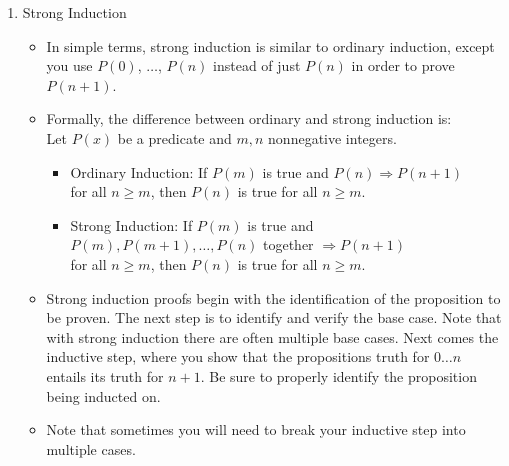 \documentclass[12pt]{article}
\begin{document}
\begin{enumerate}
\item Strong Induction
\begin{itemize}
\item In simple terms, strong induction is similar to ordinary induction, except you use $P(0)$, $\ldots$, $P(n)$ instead of just $P(n)$ in order to prove $P(n+1)$.
\item Formally, the difference between ordinary and strong induction is:\\
Let $P(x)$ be a predicate and $m,n$ nonnegative integers.
    \begin{itemize}
    \item Ordinary Induction: If $P(m)$ is true and $P(n) \Rightarrow P(n+1)$\\ for all $n \geq m$, then $P(n)$ is true for all $n      \geq m$.
    \item Strong Induction: If $P(m)$ is true and\\ $P(m), P(m+1), \dots, P(n)$ together $\Rightarrow P(n+1)$\\
    for all $n \geq m$, then $P(n)$ is true for all $n \geq m$.
    \end{itemize}
\item Strong induction proofs begin with the identification of the proposition to be proven. The next step is to identify and verify the base case. Note that with strong induction there are often multiple base cases. Next comes the inductive step, where you show that the propositions truth for $0\ldots n$ entails its truth for $n+1$. Be sure to properly identify the proposition being inducted on.  
\item Note that sometimes you will need to break your inductive step into multiple cases.
\end{itemize}
\end{enumerate}
\end{document}
